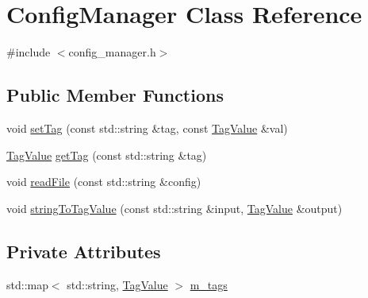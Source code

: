 \hypertarget{classConfigManager}{\section{Config\-Manager Class Reference}
\label{classConfigManager}
}


{\ttfamily \#include $<$config\-\_\-manager.\-h$>$}

\subsection*{Public Member Functions}
\begin{DoxyCompactItemize}
\item 
void \hyperlink{classConfigManager_a02426e2b6a4bb2c1b2f3c9ef524c772f}{set\-Tag} (const std\-::string \&tag, const \hyperlink{structTagValue}{Tag\-Value} \&val)
\item 
\hyperlink{structTagValue}{Tag\-Value} \hyperlink{classConfigManager_aa43f0b0afd5d15642bb986e17887abdc}{get\-Tag} (const std\-::string \&tag)
\item 
void \hyperlink{classConfigManager_ac50ce34c67bb3157c8504b99d4b705da}{read\-File} (const std\-::string \&config)
\item 
void \hyperlink{classConfigManager_a6aab6b3a9a25bc6341fb18f3b7c569b6}{string\-To\-Tag\-Value} (const std\-::string \&input, \hyperlink{structTagValue}{Tag\-Value} \&output)
\end{DoxyCompactItemize}
\subsection*{Private Attributes}
\begin{DoxyCompactItemize}
\item 
std\-::map$<$ std\-::string, \hyperlink{structTagValue}{Tag\-Value} $>$ \hyperlink{classConfigManager_a5f856d0055899581bd138476045de013}{m\-\_\-tags}
\end{DoxyCompactItemize}


